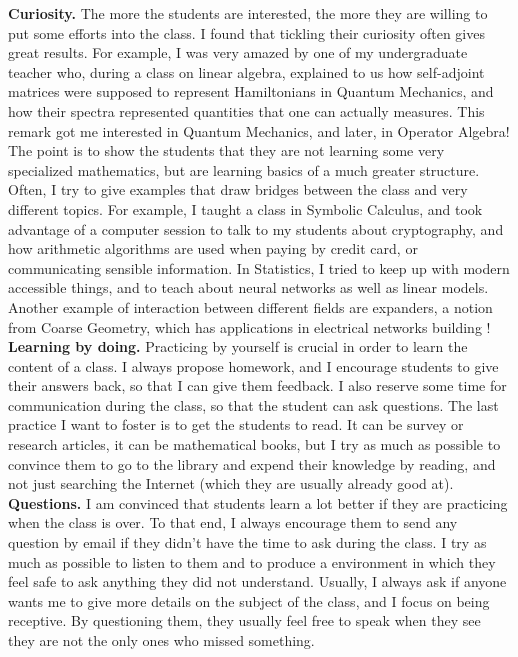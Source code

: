 \documentclass[a4paper]{article}
\begin{document}
\textbf{Curiosity.} The more the students are interested, the more they are willing to put some efforts into the class. I found that tickling their curiosity often gives great results. For example, I was very amazed by one of my undergraduate teacher who, during a class on linear algebra, explained to us how self-adjoint matrices were supposed to represent Hamiltonians in Quantum Mechanics, and how their spectra represented quantities that one can actually measures. This remark got me interested in Quantum Mechanics, and later, in Operator Algebra! The point is to show the students that they are not learning some very specialized mathematics, but are learning basics of a much greater structure. Often, I try to give examples that draw bridges between the class and very different topics. For example, I taught a class in Symbolic Calculus, and took advantage of a computer session to talk to my students about cryptography, and how arithmetic algorithms are used when paying by credit card, or communicating sensible information. In Statistics, I tried to keep up with modern accessible things, and to teach about neural networks as well as linear models. Another example of interaction between different fields are expanders, a notion from Coarse Geometry, which has applications in electrical networks building !\\

\textbf{Learning by doing.} Practicing by yourself is crucial in order to learn the content of a class. I always propose homework, and I encourage students to give their answers back, so that I can give them feedback. I also reserve some time for communication during the class, so that the student can ask questions. The last practice I want to foster is to get the students to read. It can be survey or research articles, it can be mathematical books, but I try as much as possible to convince them to go to the library and expend their knowledge by reading, and not just searching the Internet (which they are usually already good at). \\

\textbf{Questions.} I am convinced that students learn a lot better if they are practicing when the class is over. To that end, I always encourage them to send any question by email if they didn’t have the time to ask during the class. I try as much as possible to listen to them and to produce a environment in which they feel safe to ask anything they did not understand. Usually, I always ask if anyone wants me to give more details on the subject of the class, and I focus on being receptive. By questioning them, they usually feel free to speak when they see they are not the only ones who missed something.\\
\end{document}
